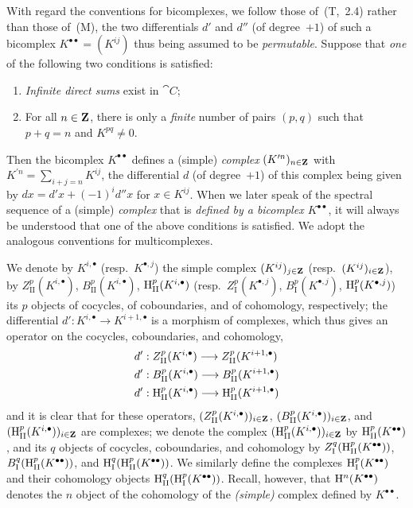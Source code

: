 \begin{env}[11.3.1]
\label{0.11.3.1}
With regard the conventions for bicomplexes, we follow those of~(T,~2.4) rather than those of~(M), the two differentials $d'$ and $d''$ (of degree~$+1$) of such a bicomplex $K^{\bullet\bullet}=(K^{ij})$ thus being assumed to be \emph{permutable}.
Suppose that \emph{one} of the following two conditions is satisfied:
\begin{enumerate}
   \item \emph{Infinite direct sums} exist in $\cat{C}$;
   \item For all $n\in\mathbf{Z}$, there is only a \emph{finite} number of pairs $(p,q)$ such that $p+q=n$ and $K^{pq}\neq 0$.
 \end{enumerate}
Then the bicomplex $K^{\bullet\bullet}$ defines a (simple) \emph{complex} $(K^{\prime n})_{n\in\mathbf{Z}}$ with $K^{\prime n}=\sum_{i+j=n}K^{ij}$, the differential $d$ (of degree~$+1$) of this complex being given by $dx=d'x+(-1)^i d''x$ for $x\in K^{ij}$.
When we later speak of the spectral sequence of a (simple) \emph{complex} that is \emph{defined by a bicomplex $K^{\bullet\bullet}$}, it will always be understood that one of the above conditions is satisfied.
We adopt the analogous conventions for multicomplexes.

We denote by $K^{i,\bullet}$ (resp.~$K^{\bullet,j}$) the simple complex $(K^{ij})_{j\in\mathbf{Z}}$ (resp.~$(K^{ij})_{i\in\mathbf{Z}}$), by $Z_\mathrm{II}^p(K^{i,\bullet})$, $B_\mathrm{II}^p(K^{i,\bullet})$, $\mathrm{H}_\mathrm{II}^p(K^{i,\bullet})$ (resp.~$Z_\mathrm{I}^p(K^{\bullet,j})$, $B_\mathrm{I}^p(K^{\bullet,j})$, $\mathrm{H}_\mathrm{I}^p(K^{\bullet,j})$) its $p$ objects of cocycles, of coboundaries, and of cohomology, respectively;
the differential $d':K^{i,\bullet}\to K^{i+1,\bullet}$ is a morphism of complexes, which thus gives an operator on the cocycles, coboundaries, and cohomology,
\begin{align*}
  d'&:Z_\mathrm{II}^p(K^{i,\bullet})\to Z_\mathrm{II}^p(K^{i+1,\bullet})
\\d'&:B_\mathrm{II}^p(K^{i,\bullet})\to B_\mathrm{II}^p(K^{i+1,\bullet})
\\d'&:\HH_\mathrm{II}^p(K^{i,\bullet})\to\HH_\mathrm{II}^p(K^{i+1,\bullet})
\end{align*}
and it is clear that for these operators, $(Z_\mathrm{II}^p(K^{i,\bullet}))_{i\in\mathbf{Z}}$, $(B_\mathrm{II}^p(K^{i,\bullet}))_{i\in\mathbf{Z}}$, and $(\mathrm{H}_\mathrm{II}^p(K^{i,\bullet}))_{i\in\mathbf{Z}}$ are complexes;
we denote the complex $(\mathrm{H}_\mathrm{II}^p(K^{i,\bullet}))_{i\in\mathbf{Z}}$ by $\mathrm{H}_\mathrm{II}^p(K^{\bullet\bullet})$, and its $q$ objects of cocycles, coboundaries, and cohomology by $Z_\mathrm{I}^q(\mathrm{H}_\mathrm{II}^p(K^{\bullet\bullet}))$, $B_\mathrm{I}^q(\mathrm{H}_\mathrm{II}^p(K^{\bullet\bullet}))$, and $\mathrm{H}_\mathrm{I}^q(\mathrm{H}_\mathrm{II}^p(K^{\bullet\bullet}))$.
We similarly define the complexes $\mathrm{H}_\mathrm{I}^p(K^{\bullet\bullet})$ and their cohomology objects $\mathrm{H}_\mathrm{II}^q(\mathrm{H}_\mathrm{I}^p(K^{\bullet\bullet}))$.
Recall, however, that $\mathrm{H}^n(K^{\bullet\bullet})$ denotes the $n$ object of the cohomology of the \emph{(simple)} complex defined by $K^{\bullet\bullet}$.
\end{env}

